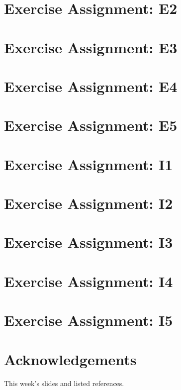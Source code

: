 \documentclass{article}
\begin{document}
\section{Exercise Assignment: E2}\label{sec:e2}

\section{Exercise Assignment: E3}\label{sec:e3}

\section{Exercise Assignment: E4}\label{sec:e4}

\section{Exercise Assignment: E5}\label{sec:e5}

\section{Exercise Assignment: I1}\label{sec:i1}

\section{Exercise Assignment: I2}\label{sec:i2}

\section{Exercise Assignment: I3}\label{sec:i3}

\section{Exercise Assignment: I4}\label{sec:i4}

\section{Exercise Assignment: I5}\label{sec:i5}






\clearpage

\section*{Acknowledgements}
This week's slides and listed references.




\clearpage

\end{document}
